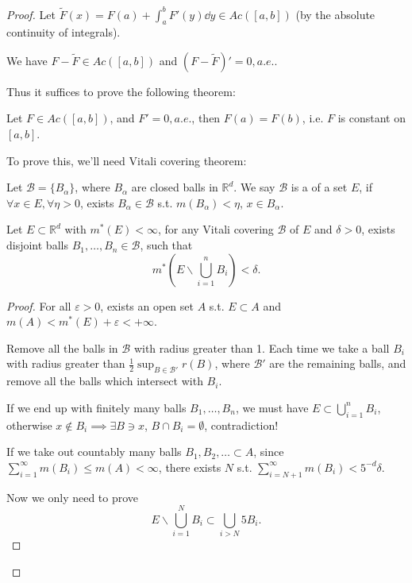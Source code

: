 \begin{proof}[Proof]
	Let $\tilde F(x) = F(a) + \int_{a}^{b} F'(y)\dd y\in Ac([a,b])$
	(by the absolute continuity of integrals).

	We have $F - \tilde F\in Ac([a,b])$ and $(F-\tilde F)' = 0, a.e.$.

	Thus it suffices to prove the following theorem:
	\begin{theorem}
		Let $F\in Ac([a,b])$, and $F'=0,a.e.$, then $F(a)=F(b)$, i.e.
		$F$ is constant on $[a,b]$.
	\end{theorem}

	To prove this, we'll need Vitali covering theorem:
	\begin{definition}
		Let $\mathcal{B} = \{B_\alpha\}$, where $B_\alpha$ are
		closed balls in $\mathbb{R}^d$.
		We say $\mathcal{B}$ is a  of a set $E$,
		if  $\forall x\in E, \forall \eta > 0$, exists $B_\alpha\in \mathcal{B}$ s.t.
		$m(B_\alpha)<\eta$,  $x\in B_\alpha$.
	\end{definition}

	\begin{theorem}[Vitali]
		\label{thm:vitali}
		Let $E \subset \mathbb{R}^{d}$ with $m^*(E)<\infty$, for any Vitali covering
		$\mathcal{B}$ of $E$ and $\delta>0$,
		exists disjoint balls $B_1,\dots,B_n\in \mathcal{B}$,
		such that
		\[
		m^*\left(E\backslash \bigcup_{i=1}^n B_i\right) < \delta.
		\]
	\end{theorem}

	\begin{proof}[Proof]
		For all $\varepsilon > 0$, exists an open set $A$ s.t. $E \subset A$
		and $m(A)<m^*(E) + \varepsilon < + \infty$.

		Remove all the balls in $\mathcal{B}$ with radius greater than 1.
		Each time we take a ball $B_i$ with radius greater
		than $\frac{1}{2}\sup_{B\in \mathcal{B}'} r(B)$, where $\mathcal{B}'$ are
		the remaining balls, and remove all the balls which intersect with $B_i$.

		If we end up with finitely many balls  $B_1,\dots,B_n$, we must
		have $E \subset \bigcup_{i=1}^n B_i$,
		otherwise $x\notin B_i\implies \exists B\ni x$,
		$B\cap B_i = \emptyset$, contradiction!

		If we take out countably many balls $B_1,B_2,\dots \subset A$,
		since $ \sum_{i=1}^{\infty} m(B_i) \le m(A) <\infty$,
		there exists $N$ s.t. $ \sum_{i=N+1}^{\infty} m(B_i) < 5^{-d}\delta$.

		Now we only need to prove
		\[
			E\backslash \bigcup_{i=1}^N B_i \subset \bigcup_{i>N}5B_i.
		\]
	\end{proof}


\end{proof}
